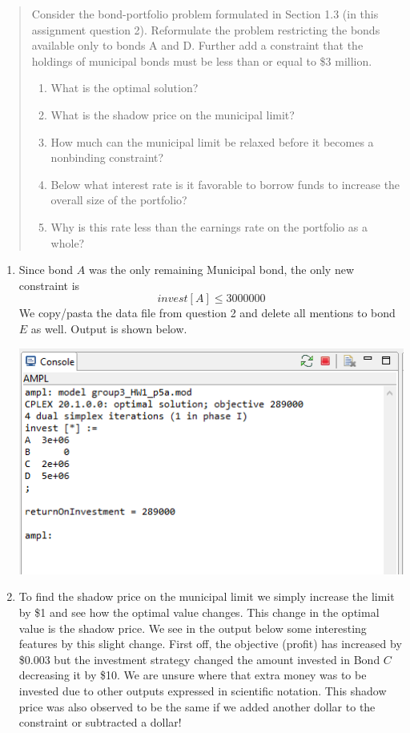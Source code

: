 \documentclass[11pt]{article}
\begin{document}
\begin{enumerate}
\begin{quote}
Consider the bond-portfolio problem formulated in Section 1.3 (in this assignment question 2). Reformulate the problem restricting the bonds available only to bonds A and D. Further add a constraint that the holdings of municipal bonds must be less than or equal to \$3 million.
\begin{enumerate}
\item What is the optimal solution?
\item What is the shadow price on the municipal limit?
\item How much can the municipal limit be relaxed before it becomes a nonbinding constraint?
\item Below what interest rate is it favorable to borrow funds to increase the overall size of the portfolio?
\item Why is this rate less than the earnings rate on the portfolio as a whole?
\end{enumerate}
\end{quote}
\begin{enumerate}
\item Since bond $A$ was the only remaining Municipal bond, the only new constraint is
\[
invest[A] \leq 3 000 000
\]
We copy/pasta the data file from question 2 and delete all mentions to bond $E$ as well.  Output is shown below.

\includegraphics{outputp5a.png}

\item To find the shadow price on the municipal limit we simply increase the limit by \$1 and see how the optimal value changes.  This change in the optimal value is the shadow price.  We see in the output below some interesting features by this slight change.  First off, the objective (profit) has increased by \$0.003 but the investment strategy changed the amount invested in Bond $C$ decreasing it by \$10.  We are unsure where that extra money was to be invested due to other outputs expressed in scientific notation.  This shadow price was also observed to be the same if we added another dollar to the constraint or subtracted a dollar!


\end{enumerate}
\end{enumerate}
\end{document}
